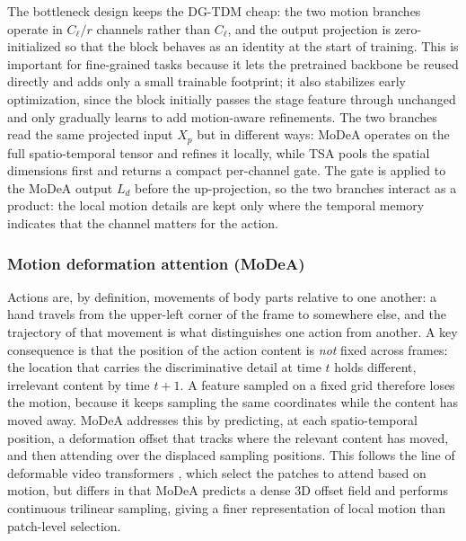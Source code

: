 The bottleneck design keeps the DG-TDM cheap: the two motion branches operate
in $C_\ell / r$ channels rather than $C_\ell$, and the output projection is
zero-initialized so that the block behaves as an identity at the start of
training. This is important for fine-grained tasks because it lets the
pretrained backbone be reused directly and adds only a small trainable
footprint; it also stabilizes early optimization, since the block initially
passes the stage feature through unchanged and only gradually learns to add
motion-aware refinements. The two branches read the same projected input
$X_p$ but in different ways: MoDeA operates on the full spatio-temporal
tensor and refines it locally, while TSA pools the spatial dimensions first
and returns a compact per-channel gate. The gate is applied to the MoDeA
output $L_d$ before the up-projection, so the two branches interact as a
product: the local motion details are kept only where the temporal memory
indicates that the channel matters for the action.

\subsubsection{Motion deformation attention (MoDeA)}
\label{sec:modela}

Actions are, by definition, movements of body parts relative to one another:
a hand travels from the upper-left corner of the frame to somewhere else, and
the trajectory of that movement is what distinguishes one action from another.
A key consequence is that the position of the action content is \emph{not}
fixed across frames: the location that carries the discriminative detail at
time $t$ holds different, irrelevant content by time $t+1$. A feature sampled
on a fixed grid therefore loses the motion, because it keeps sampling the same
coordinates while the content has moved away. MoDeA addresses this by
predicting, at each spatio-temporal position, a deformation offset that tracks
where the relevant content has moved, and then attending over the displaced
sampling positions. This follows the line of deformable video transformers
\cite{dvt2022}, which select the patches to attend based on motion, but differs
in that MoDeA predicts a dense 3D offset field and performs continuous
trilinear sampling, giving a finer representation of local motion than
patch-level selection.


